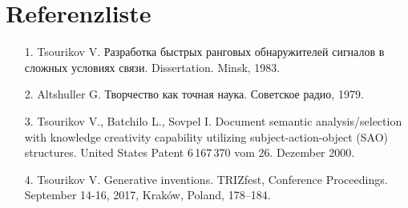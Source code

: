 \documentclass[11pt,a4paper]{article}
\begin{document}
\section{Referenzliste}
\raggedright
\begin{itemize}
\item [1.] Tsourikov V. \foreignlanguage{russian}{Разработка быстрых ранговых
  обнаружителей сигналов в сложных условиях связи}. Dissertation. Minsk, 1983.
\item [2.] Altshuller G. \foreignlanguage{russian}{Творчество как точная
  наука. Советское радио}, 1979.
\item [3.] Tsourikov V., Batchilo L., Sovpel I. Document semantic
  analysis/selection with knowledge creativity capability utilizing
  subject-action-object (SAO) structures. United States Patent 6\,167\,370
  vom 26. Dezember 2000.
\item [4.] Tsourikov V. Generative inventions. TRIZfest, Conference
  Proceedings. September 14-16, 2017, Kraków, Poland, 178--184.
\end{itemize}
\end{document}
